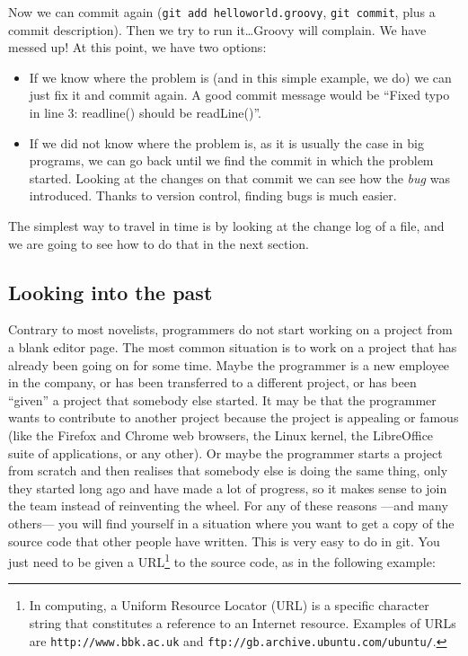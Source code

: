 Now we can commit again (\verb+git add helloworld.groovy+,
\verb+git commit+, plus a commit description). Then we try to run
it\ldots Groovy will complain. We have messed up! At this point, we
have two options:

\begin{itemize}
\item If we know where the problem is (and in this simple example, we
  do) we can just fix it and commit again. A good commit message would
  be ``Fixed typo in line 3: readline() should be readLine()''.
\item If we did not know where the problem is, as it is usually the
  case in big programs, we can go back until we find the commit in
  which the problem started. Looking at the changes on that commit we
  can see how the \emph{bug} was introduced. Thanks to version
  control, finding bugs is much easier. 
\end{itemize}

The simplest way to travel in time is by looking at the change log of
a file, and we are going to see how to do that in the next section. 

\subsection{Looking into the past}
\label{sec:looking-into-past}

Contrary to most novelists, programmers do not start working on a
project from a blank editor page. The most common situation is to work
on a project that has already been going on for some time. Maybe the
programmer is a new employee in the company, or has been transferred
to a different project, or has been ``given'' a project that somebody
else started. It may be that the programmer wants to contribute to
another project because the project is appealing or famous (like the
Firefox and Chrome web browsers, the Linux kernel, the LibreOffice
suite of applications, or any other). Or maybe the programmer starts a
project from scratch and then realises that somebody else is doing the
same thing, only they started long ago and have made a lot of
progress, so it makes sense to join the team instead of reinventing
the wheel. For any of these reasons ---and many others--- you will
find yourself in a situation where you want to get a copy of the
source code that other people have written. This is very easy to do in
git. You just need to be given a URL\footnote{In computing, a Uniform
  Resource Locator (URL) is a specific character string that
  constitutes a reference to an Internet resource. Examples of URLs
  are \texttt{http://www.bbk.ac.uk} and
  \texttt{ftp://gb.archive.ubuntu.com/ubuntu/}.
} to the source code, as
in the following example:

